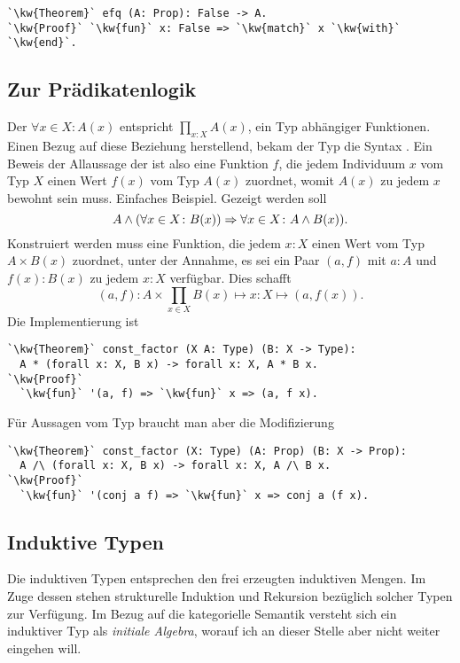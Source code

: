 \begin{lstlisting}[escapechar=`, xleftmargin=\mathindent]
`\kw{Theorem}` efq (A: Prop): False -> A.
`\kw{Proof}` `\kw{fun}` x: False => `\kw{match}` x `\kw{with}` `\kw{end}`.
\end{lstlisting}

\subsection{Zur Prädikatenlogik}

Der  $\forall x\in X\colon A(x)$ entspricht
$\prod_{x\colon X} A(x)$, ein Typ abhängiger Funktionen. Einen Bezug auf
diese Beziehung herstellend, bekam der Typ die Syntax
. Ein Beweis der Allaussage der ist also eine
Funktion $f$, die jedem Individuum $x$ vom Typ $X$ einen Wert $f(x)$ vom
Typ $A(x)$ zuordnet, womit $A(x)$ zu jedem $x$ bewohnt sein muss.
Einfaches Beispiel. Gezeigt werden soll
\[A\land (\forall x\in X\colon B(x))\Rightarrow\forall x\in X\colon A\land B(x)).\]
Konstruiert werden muss eine Funktion, die jedem $x\colon X$ einen
Wert vom Typ $A\times B(x)$ zuordnet, unter der Annahme, es sei ein Paar $(a,f)$
mit $a\colon A$ und $f(x)\colon B(x)$ zu jedem $x\colon X$ verfügbar.
Dies schafft
\[\textstyle (a,f)\colon A\times\prod_{x\in X} B(x)\mapsto
x\colon X\mapsto (a, f(x)).\]
Die Implementierung ist
\begin{lstlisting}[escapechar=`, xleftmargin=\mathindent]
`\kw{Theorem}` const_factor (X A: Type) (B: X -> Type):
  A * (forall x: X, B x) -> forall x: X, A * B x.
`\kw{Proof}`
  `\kw{fun}` '(a, f) => `\kw{fun}` x => (a, f x).
\end{lstlisting}
Für Aussagen vom Typ  braucht man aber die Modifizierung
\begin{lstlisting}[escapechar=`, xleftmargin=\mathindent]
`\kw{Theorem}` const_factor (X: Type) (A: Prop) (B: X -> Prop):
  A /\ (forall x: X, B x) -> forall x: X, A /\ B x.
`\kw{Proof}`
  `\kw{fun}` '(conj a f) => `\kw{fun}` x => conj a (f x).
\end{lstlisting}

\subsection{Induktive Typen}

Die induktiven Typen entsprechen den frei erzeugten induktiven Mengen.
Im Zuge dessen stehen strukturelle Induktion und Rekursion bezüglich
solcher Typen zur Verfügung. Im Bezug auf die kategorielle Semantik
versteht sich ein induktiver Typ als \emph{initiale Algebra}, worauf ich
an dieser Stelle aber nicht weiter eingehen will.

